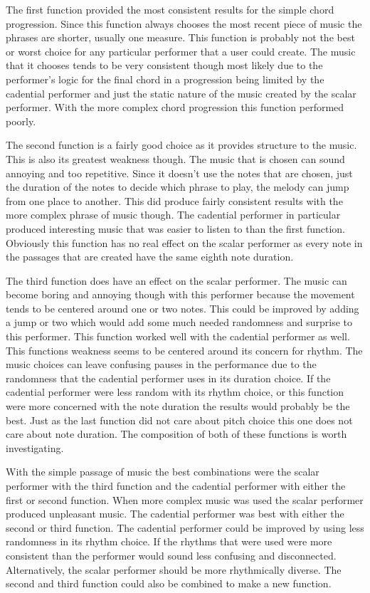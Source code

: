 \documentclass[12pt]{ucthesis}
\begin{document}
The first function provided the most consistent results for the simple chord progression. Since this function always chooses the most recent piece of music the phrases are shorter, usually one measure. This function is probably not the best or worst choice for any particular performer that a user could create. The music that it chooses tends to be very consistent though most likely due to the performer's logic for the final chord in a progression being limited by the cadential performer and just the static nature of the music created by the scalar performer.  With the more complex chord progression this function performed poorly.

The second function is a fairly good choice as it provides structure to the music. This is also its greatest weakness though. The music that is chosen can sound annoying and too repetitive. Since it doesn't use the notes that are chosen, just the duration of the notes to decide which phrase to play, the melody can jump from one place to another. This did produce fairly consistent results with the more complex phrase of music though. The cadential performer in particular produced interesting music that was easier to listen to than the first function. Obviously this function has no real effect on the scalar performer as every note in the passages that are created have the same eighth note duration.

The third function does have an effect on the scalar performer. The music can become boring and annoying though with this performer because the movement tends to be centered around one or two notes. This could be improved by adding a jump or two which would add some much needed randomness and surprise to this performer. This function worked well with the cadential performer as well. This functions weakness seems to be centered around its concern for rhythm. The music choices can leave confusing pauses in the performance due to the randomness that the cadential performer uses in its duration choice. If the cadential performer were less random with its rhythm choice, or this function were more concerned with the note duration the results would probably be the best. Just as the last function did not care about pitch choice this one does not care about note duration. The composition of both of these functions is worth investigating. 

With the simple passage of music the best combinations were the scalar performer with the third function and the cadential performer with either the first or second function. When more complex music was used the scalar performer produced unpleasant music. The cadential performer was best with either the second or third function. The cadential performer could be improved by using less randomness in its rhythm choice. If the rhythms that were used were more consistent than the performer would sound less confusing and disconnected. Alternatively, the scalar performer should be more rhythmically diverse. The second and third function could also be combined to make a new function. 
\end{document}

